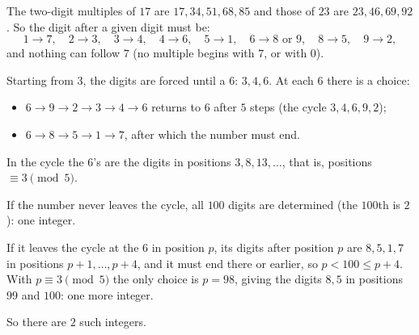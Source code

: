 The two-digit multiples of $17$ are $17,34,51,68,85$ and those of $23$ are $23,46,69,92$. So the digit after a given digit must be:
\[
1\to7,\quad 2\to3,\quad 3\to4,\quad 4\to6,\quad 5\to1,\quad 6\to8\text{ or }9,\quad 8\to5,\quad 9\to2,
\]
and nothing can follow $7$ (no multiple begins with $7$, or with $0$).

Starting from $3$, the digits are forced until a $6$: $3,4,6$. At each $6$ there is a choice:
\begin{itemize}
\item $6\to9\to2\to3\to4\to6$ returns to $6$ after $5$ steps (the cycle $3,4,6,9,2$);
\item $6\to8\to5\to1\to7$, after which the number must end.
\end{itemize}
In the cycle the $6$'s are the digits in positions $3,8,13,\dots$, that is, positions $\equiv3\pmod5$.

If the number never leaves the cycle, all $100$ digits are determined (the $100$th is $2$): one integer.

If it leaves the cycle at the $6$ in position $p$, its digits after position $p$ are $8,5,1,7$ in positions $p+1,\dots,p+4$, and it must end there or earlier, so $p<100\le p+4$. With $p\equiv3\pmod5$ the only choice is $p=98$, giving the digits $8,5$ in positions $99$ and $100$: one more integer.

So there are $\boxed{2}$ such integers.
